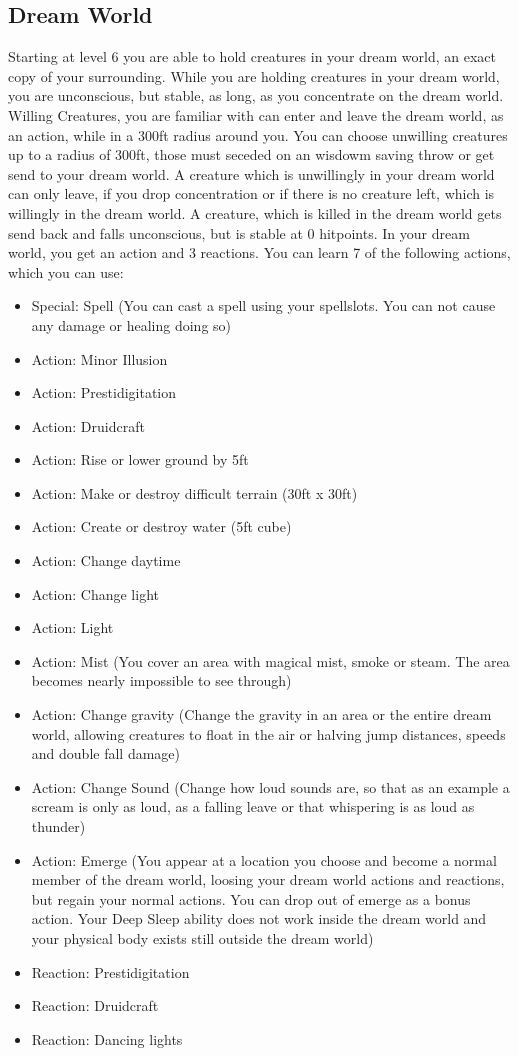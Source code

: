 \documentclass[a4paper,10pt,twoside,twocolumn]{dndbook} %
\begin{document}
	\subsection{Dream World}
	Starting at level 6 you are able to hold creatures in your dream world, an exact copy of your surrounding. While you are holding creatures in your dream world, you are unconscious, but stable, as long, as you concentrate on the dream world. Willing Creatures, you are familiar with can enter and leave the dream world, as an action, while in a 300ft radius around you. You can choose unwilling creatures up to a radius of 300ft, those must seceded on an wisdowm saving throw or get send to your dream world. A creature which is unwillingly in your dream world can only leave, if you drop concentration or if there is no creature left, which is willingly in the dream world. A creature, which is killed in the dream world gets send back and falls unconscious, but is stable at 0 hitpoints. In your dream world, you get an action and 3 reactions. You can learn 7 of the following actions, which you can use:
	\begin{itemize}
		\item Special: Spell (You can cast a spell using your spellslots. You can not cause any damage or healing doing so)
		\item Action: Minor Illusion
		\item Action: Prestidigitation
		\item Action: Druidcraft
		\item Action: Rise or lower ground by 5ft
		\item Action: Make or destroy difficult terrain (30ft x 30ft)
		\item Action: Create or destroy water (5ft cube)
		\item Action: Change daytime
		\item Action: Change light
		\item Action: Light
		\item Action: Mist (You cover an area with magical mist, smoke or steam. The area becomes nearly impossible to see through)
		\item Action: Change gravity (Change the gravity in an area or the entire dream world, allowing creatures to float in the air or halving jump distances, speeds and double fall damage)
		\item Action: Change Sound (Change how loud sounds are, so that as an example a scream is only as loud, as a falling leave or that whispering is as loud as thunder)
		\item Action: Emerge (You appear at a location you choose and become a normal member of the dream world, loosing your dream world actions and reactions, but regain your normal actions. You can drop out of emerge as a bonus action. Your Deep Sleep ability does not work inside the dream world and your physical body exists still outside the dream world)
		\item Reaction: Prestidigitation
		\item Reaction: Druidcraft
		\item Reaction: Dancing lights
	\end{itemize}
\end{document}
